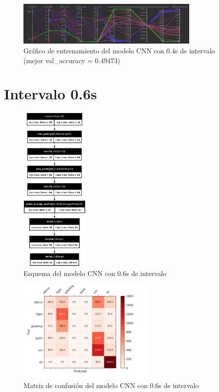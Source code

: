 \begin{figure}[H]
    \centering
    \includegraphics[width=0.8\textwidth]{Imagenes/Bitmap/tb-cnn-0.4.png}
    \caption{Gráfico de entrenamiento del modelo CNN con 0.4s de intervalo (mejor val\_accuracy = 0.49473)}
    \label{fig:cnn-0.4-grafico}
\end{figure}

\section{Intervalo 0.6s}

\begin{figure}[H]
    \centering
    \includegraphics[width=0.3\textwidth]{Imagenes/Bitmap/best-cnn0.6.png}
    \caption{Esquema del modelo CNN con 0.6s de intervalo}
    \label{fig:cnn-0.6-final}
\end{figure}

\begin{figure}[H]
    \centering
    \includegraphics[width=0.6\textwidth]{Imagenes/Bitmap/CM_best-cnn0.6.png}
    \caption{Matriz de confusión del modelo CNN con 0.6s de intervalo}
    \label{fig:cnn-0.6-matriz}
\end{figure}

